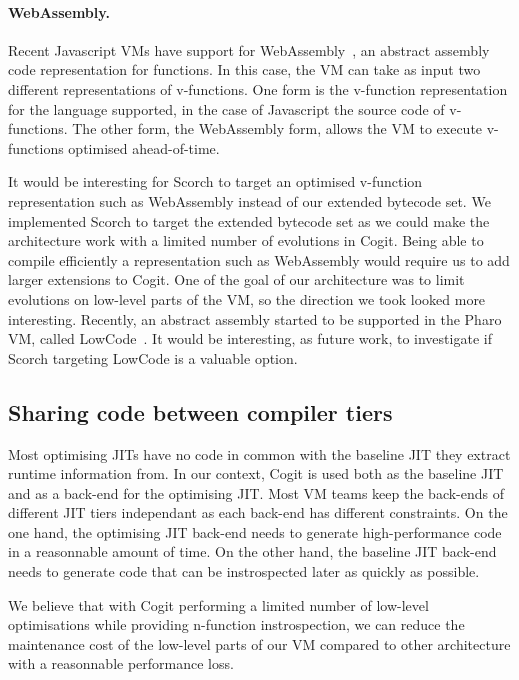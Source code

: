 \documentclass[a4paper,12pt,twoside]{../includes/ThesisStyle}
\begin{document}
\paragraph{WebAssembly.}
Recent Javascript VMs have support for WebAssembly~\cite{WebAssembly}, an abstract assembly code representation for functions. In this case, the VM can take as input two different representations of v-functions. One form is the v-function representation for the language supported, in the case of Javascript the source code of v-functions. The other form, the WebAssembly form, allows the VM to execute v-functions optimised ahead-of-time.

It would be interesting for Scorch to target an optimised v-function representation such as WebAssembly instead of our extended bytecode set. We implemented Scorch to target the extended bytecode set as we could make the architecture work with a limited number of evolutions in Cogit. Being able to compile efficiently a representation such as WebAssembly would require us to add larger extensions to Cogit. One of the goal of our architecture was to limit evolutions on low-level parts of the VM, so the direction we took looked more interesting. Recently, an abstract assembly started to be supported in the Pharo VM, called LowCode~\cite{Salg16a}. It would be interesting, as future work, to investigate if Scorch targeting LowCode is a valuable option.

\subsection{Sharing code between compiler tiers}
\label{sec:codeSharing}

Most optimising JITs have no code in common with the baseline JIT they extract runtime information from. In our context, Cogit is used both as the baseline JIT and as a back-end for the optimising JIT. Most VM teams keep the back-ends of different JIT tiers independant as each back-end has different constraints. On the one hand, the optimising JIT back-end needs to generate high-performance code in a reasonnable amount of time. On the other hand, the baseline JIT back-end needs to generate code that can be instrospected later as quickly as possible. 

We believe that with Cogit performing a limited number of low-level optimisations while providing n-function instrospection, we can reduce the maintenance cost of the low-level parts of our VM compared to other architecture with a reasonnable performance loss. 
\end{document}
